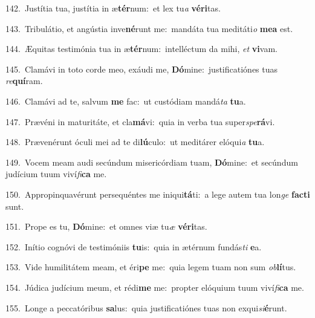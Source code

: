 {\numbfont\textcolor{\numbcolor}{142.}}~Justítia tua, justítia in æ\-\textbf{tér}\-num:~\star et lex tu\textit{a} \textbf{vé}\-\textbf{ri}tas.\par
{\numbfont\textcolor{\numbcolor}{143.}}~Tribulátio, et angústia inve\-\textbf{né}\-runt me:~\star mandáta tua meditáti\textit{o} \textbf{me}\-\textbf{a} est.\par
{\numbfont\textcolor{\numbcolor}{144.}}~Æquitas testimónia tua in æ\-\textbf{tér}\-num:~\star intelléctum da mihi, \textit{et} \textbf{vi}\-vam.\par
{\numbfont\textcolor{\numbcolor}{145.}}~Clamávi in toto corde meo, exáudi me, \textbf{Dó}\-mine:~\star justificatiónes tuas \textit{re}\-\textbf{quí}ram.\par
{\numbfont\textcolor{\numbcolor}{146.}}~Clamávi ad te, salvum \textbf{me} fac:~\star ut custódiam mandá\textit{ta} \textbf{tu}\-a.\par
{\numbfont\textcolor{\numbcolor}{147.}}~Prævéni in maturitáte, et cla\-\textbf{má}\-vi:~\star quia in verba tua super\-\textit{spe}\-\textbf{rá}vi.\par
{\numbfont\textcolor{\numbcolor}{148.}}~Prævenérunt óculi mei ad te di\-\textbf{lú}\-culo:~\star ut meditárer elóqui\textit{a} \textbf{tu}\-a.\par
{\numbfont\textcolor{\numbcolor}{149.}}~Vocem meam audi secúndum misericórdiam tuam, \textbf{Dó}\-mine:~\star et secúndum judícium tuum viví\-\textit{fi}\-\textbf{ca} me.\par
{\numbfont\textcolor{\numbcolor}{150.}}~Appropinquavérunt persequéntes me iniqui\-\textbf{tá}\-ti:~\star a lege autem tua lon\textit{ge} \textbf{fac}\-\textbf{ti} sunt.\par
{\numbfont\textcolor{\numbcolor}{151.}}~Prope es tu, \textbf{Dó}\-mine:~\star et omnes viæ tu\textit{æ} \textbf{vé}\-\textbf{ri}tas.\par
{\numbfont\textcolor{\numbcolor}{152.}}~Inítio cognóvi de testimóniis \textbf{tu}\-is:~\star quia in ætérnum fundás\textit{ti} \textbf{e}\-a.\par
{\numbfont\textcolor{\numbcolor}{153.}}~Vide humilitátem meam, et éri\textbf{pe} me:~\star quia legem tuam non sum \textit{ob}\-\textbf{lí}tus.\par
{\numbfont\textcolor{\numbcolor}{154.}}~Júdica judícium meum, et rédi\textbf{me} me:~\star propter elóquium tuum viví\-\textit{fi}\-\textbf{ca} me.\par
{\numbfont\textcolor{\numbcolor}{155.}}~Longe a peccatóribus \textbf{sa}\-lus:~\star quia justificatiónes tuas non exqui\-\textit{si}\-\textbf{é}runt.\par
